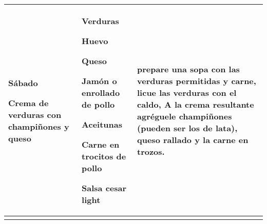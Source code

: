 \documentclass[menu.tex]{subfiles}
\begin{document}
\begin{tabular} {p{3cm} p{4.5cm} p{9cm}}
\pbox{20cm}
{
    \rule{0pt}{3ex}\begin{large}\textbf{Sábado}\end{large}\\
    \rule{0pt}{2ex}Crema de verduras con champiñones y queso
}& 
\vspace{-0.3cm}
\begin{compactitem} 
    \begin{footnotesize}
        \item Verduras
        \item Huevo
        \item Queso
        \item Jamón o enrollado de pollo
        \item Aceitunas
        \item Carne en trocitos de pollo
        \item Salsa cesar light
    \end{footnotesize}
\end{compactitem}&
\vspace{-0.3cm}
prepare una sopa con las verduras permitidas y carne, licue las verduras con el caldo, A la crema resultante agréguele champiñones (pueden ser los de lata), queso rallado y la carne en trozos.\\ \hline
\newpage
\end{tabular}
\end{document}
